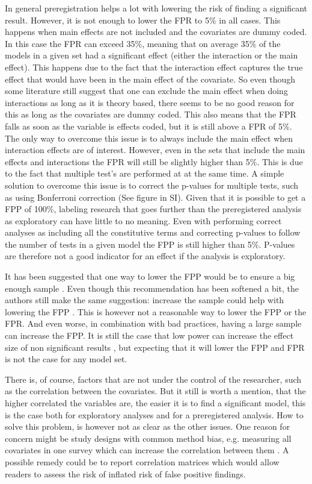 In general preregistration helps a lot with lowering the risk of finding a significant result. However, it is not enough to lower the FPR to 5\%  in all cases. This happens when main effects are not included and the covariates are dummy coded. In this case the FPR can exceed 35\%, meaning that on average 35\% of the models in a given set had a significant effect (either the interaction or the main effect). This happens due to the fact that the interaction effect captures the true effect that would have been in the main effect of the covariate. So even though some literature still suggest that one can exclude the main effect when doing interactions as long as it is theory based, there seems to be no good reason for this as long as the covariates are dummy coded. This also means that the FPR falls as soon as the variable is effects coded, but it is still above a FPR of 5\%. The only way to overcome this issue is to always include the main effect when interaction effects are of interest. However, even in the sets that include the main effects and interactions the FPR will still be slightly higher than 5\%. This is due to the fact that multiple test's are performed at at the same time. A simple solution to overcome this issue is to correct the p-values for multiple tests, such as using Bonferroni correction \citep{dunn1961multiple} (See figure in SI).  
Given that it is possible to get a FPP of 100\%, labeling research that goes further than the preregistered analysis as exploratory can have little to no meaning. Even with performing correct analyses as including all the constitutive terms and correcting p-values to follow the number of tests in a given model the FPP is still higher than 5\%. P-values are therefore not a good indicator for an effect if the analysis is exploratory. 
    
It has been suggested that one way to lower the FPP would be to ensure a big enough sample \citep{Simmons2011}. Even though this recommendation has been softened a bit, the authors still make the same suggestion: increase the sample could help with lowering the FPP \cite{simmons2018}. This is however not a reasonable way to lower the FPP or the FPR. And even worse, in combination with bad practices, having a large sample can increase the FPP. It is still the case that low power can increase the effect size of non significant results \citep{loken2017measurement}, but expecting that it will lower the FPP and FPR is not the case for any model set. 

There is, of course, factors that are not under the control of the researcher, such as the correlation between the covariates. But it still is worth a mention, that the higher correlated the variables are, the easier it is to find a significant model, this is the case both for exploratory analyses and for a preregistered analysis. How to solve this problem, is however not as clear as the other issues. One reason for concern might be study designs with common method bias, e.g. measuring all covariates in one survey which can increase the correlation between them \citep{podsakoff2003}. A possible remedy could be to report correlation matrices which would allow readers to assess the risk of inflated risk of false positive findings.   

